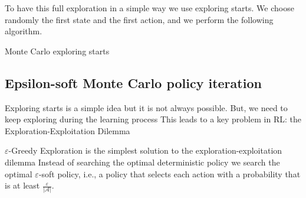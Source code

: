 To have this full exploration in a simple way we use exploring starts. 
We choose randomly the first state and the first action, and we perform the following algorithm. 
\begin{algorithm}[H]
    \caption{Monte Carlo exploring starts}
        \begin{algorithmic}[1]
            \Loop 
                    \EndIf
                \EndFor
            \EndLoop
        \end{algorithmic}
\end{algorithm}

\subsection{Epsilon-soft Monte Carlo policy iteration}
Exploring starts is a simple idea but it is not always possible. 
But, we need to keep exploring during the learning process
This leads to a key problem in RL: the Exploration-Exploitation Dilemma


$\varepsilon$-Greedy Exploration is the simplest solution to the exploration-exploitation dilemma
Instead of searching the optimal deterministic policy we search the optimal $\varepsilon$-soft
policy, i.e., a policy that selects each action with a probability that is at least $\frac{\varepsilon}{\left\lvert \mathcal{A}\right\rvert}$. 

